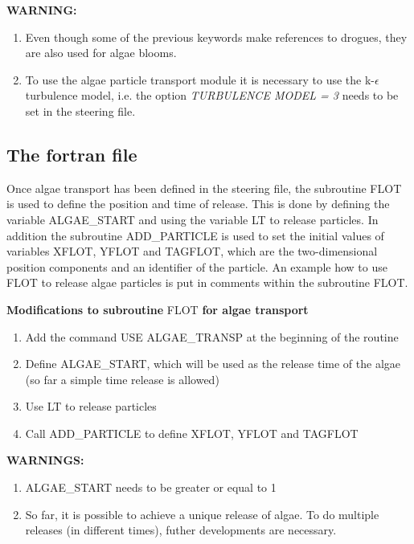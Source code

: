  \textbf{WARNING:}

\begin{enumerate}
\item  Even though some of the previous keywords make references to drogues, they are also used for algae blooms.

\item  To use the algae particle transport module it is necessary to use the k-$\epsilon$ turbulence model, i.e. the option \textit{TURBULENCE MODEL = 3} needs to be set in the steering file.
\end{enumerate}


\subsection{ The fortran file}

 Once algae transport has been defined in the steering file, the subroutine FLOT is used to define the position and time of release. This is done by defining the variable ALGAE\_START and using the variable LT to release particles. In addition the subroutine ADD\_PARTICLE is used to set the initial values of variables XFLOT, YFLOT and TAGFLOT, which are the two-dimensional position components and an identifier of the particle. An example how to use FLOT to release algae particles is put in comments within the subroutine FLOT.

 \textbf{Modifications to subroutine }FLOT\textbf{ for algae transport}

\begin{enumerate}
\item \textbf{ }Add the command USE ALGAE\_TRANSP at the beginning of the routine

\item  Define ALGAE\_START, which will be used as the release time of the algae (so far a simple time release is allowed)

\item  Use LT to release particles

\item  Call ADD\_PARTICLE to define XFLOT, YFLOT and TAGFLOT
\end{enumerate}

 \textbf{WARNINGS:}

\begin{enumerate}
\item  ALGAE\_START needs to be greater or equal to 1

\item  So far, it is possible to achieve a unique release of algae. To do multiple releases (in different times), futher developments are necessary.
\end{enumerate}


